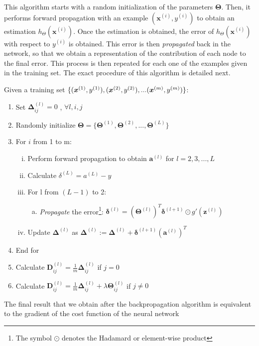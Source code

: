 \documentclass[a4paper, report, oneside, UKenglish]{memoir}
\DeclarePairedDelimiter{\set}{\lbrace}{\rbrace} %
\newcommand{\ba}{\boldsymbol{a}}
\newcommand{\bD}{\boldsymbol{D}}
\newcommand{\x}{\boldsymbol{x}}
\newcommand{\bz}{\boldsymbol{z}}
\newcommand{\bdelta}{\boldsymbol{\delta}}
\newcommand{\bDelta}{\boldsymbol{\Delta}}
\newcommand{\bTheta}{\boldsymbol{\Theta}}
\begin{document}
This algorithm starts with a random initialization of the parameters $\bTheta$. Then, it performs forward propagation with an example $(\x^{(i)}, y^{(i)})$ to obtain an estimation $h_\Theta(\x^{(i)})$. Once the estimation is obtained, the error of $h_\Theta(\x^{(i)})$ with respect to $y^{(i)}$ is obtained. This error is then \textit{propagated} back in the network, so that we obtain a representation of the contribution of each node to the final error. This process is then repeated for each one of the examples given in the training set. The exact procedure of this algorithm is detailed next.

Given a training set $\set{(\x^{(1)}, y^{(1)}), (\x^{(2)}, y^{(2)}), ... (\x^{(m)}, y^{(m)})}$:

\begin{enumerate}
    \item Set $\bDelta_{ij}^{(l)} = 0$ , $\forall l, i, j$
    \item Randomly initialize $\bTheta = \{\bTheta^{(1)}, \bTheta^{(2)}, ..., \bTheta^{(L)}\}$
    \item For $i$ from 1 to m:
    \begin{enumerate}[i.]
        \item Perform forward propagation to obtain $\ba ^{(l)}$ for $l=2, 3, ..., L$
        \item Calculate $\delta^{(L)} = a^{(L)} - y$
        \item For l from $(L-1)$ to 2:
        \begin{enumerate}[a.]
            \item \textit{Propagate} the error\footnote{The symbol $\odot$ denotes the Hadamard or element-wise product}: $\bdelta^{(l)} = (\bTheta^{(l)})^T\bdelta^{(l+1)} \odot g'(\bz^{(l)})$
        \end{enumerate}
        \item Update $\bDelta^{(l)}$ as $\bDelta^{(l)} := \bDelta^{(l)} + \bdelta^{(l+1)}(\ba^{(l)})^T$
    \end{enumerate}
    \item End for
    \item Calculate $\bD_{ij}^{(l)} = \frac{1}{m} \bDelta_{ij}^{(l)}$ if $j = 0$
    \item Calculate $\bD_{ij}^{(l)} = \frac{1}{m} \bDelta_{ij}^{(l)} + \lambda \bTheta_{ij}^{(l)}$ if $j \neq 0$
\end{enumerate}

The final result that we obtain after the backpropagation algorithm is equivalent to the gradient of the cost function of the neural network
\end{document}
